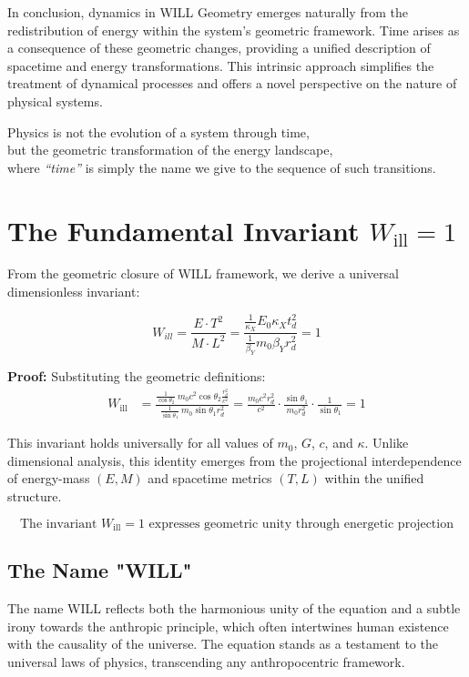 \documentclass[12pt, a4paper]{article}
\begin{document}
In conclusion, dynamics in WILL Geometry emerges naturally from the redistribution of energy within the system's geometric framework. Time arises as a consequence of these geometric changes, providing a unified description of spacetime and energy transformations. This intrinsic approach simplifies the treatment of dynamical processes and offers a novel perspective on the nature of physical systems.

\begin{tcolorbox}[colback=gray!5,colframe=black!75!black,title=Geometric Principle of Evolution, fonttitle=\bfseries]
Physics is not the evolution of a system through time,\\
but the geometric transformation of the energy landscape,\\
where \textit{“time”} is simply the name we give to the sequence of such transitions.
\end{tcolorbox}

\section{The Fundamental Invariant $W_{\text{ill}} = 1$}

From the geometric closure of WILL framework, we derive a universal dimensionless invariant:

\begin{equation}
W_{ill} = \frac{E \cdot T^2}{M \cdot L^2} = \frac{\frac{1}{\kappa_{X}} E_0 \kappa_{X} t^2_{d}}{\frac{1}{\beta_{Y}} m_0\beta_{Y} r^2_{d}} = 1
\end{equation}

\textbf{Proof:} Substituting the geometric definitions:
\begin{align}
W_{\text{ill}} &= \frac{\frac{1}{\cos \theta_2}\ m_0c^2 \cos \theta_2 \frac{r^2_{d}}{c^2}}{\frac{1}{\sin\theta_1}\ m_0 \sin\theta_1 r^2_{d}} = \frac{m_0c^2 r^2_{d}}{c^2} \cdot \frac{\sin\theta_1}{m_0 r^2_{d}} \cdot \frac{1}{\sin\theta_1} = 1
\end{align}

This invariant holds universally for all values of $m_0$, $G$, $c$, and $\kappa$. Unlike dimensional analysis, this identity emerges from the projectional interdependence of energy-mass $(E,M)$ and spacetime metrics $(T,L)$ within the unified structure.

\[
\boxed{\text{The invariant } W_{\text{ill}} = 1 \text{ expresses geometric unity through energetic projection}}
\]

\subsection{The Name "WILL"}
The name WILL reflects both the harmonious unity of the equation and a subtle irony towards the anthropic principle, which often intertwines human existence with the causality of the universe. The equation stands as a testament to the universal laws of physics, transcending any anthropocentric framework.
\end{document}
